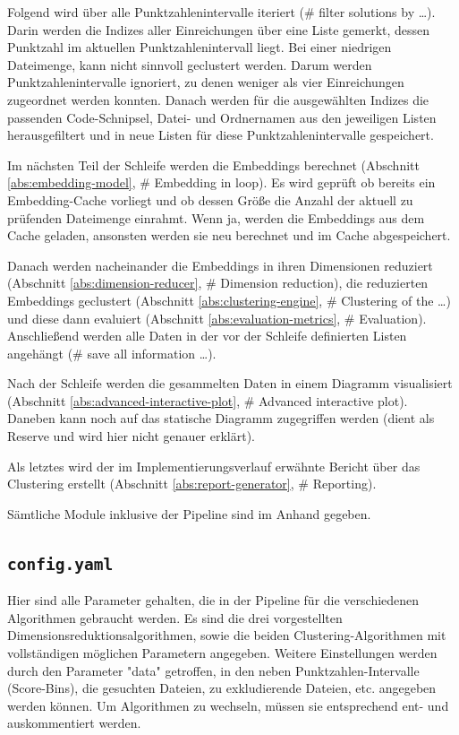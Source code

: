 Folgend wird über alle Punktzahlenintervalle iteriert (\# filter solutions by \dots). Darin werden die Indizes aller Einreichungen über eine Liste gemerkt, dessen Punktzahl im aktuellen Punktzahlenintervall liegt. Bei einer niedrigen Dateimenge, kann nicht sinnvoll geclustert werden. Darum werden Punktzahlenintervalle ignoriert, zu denen weniger als vier Einreichungen zugeordnet werden konnten. Danach werden für die ausgewählten Indizes die passenden Code-Schnipsel, Datei- und Ordnernamen aus den jeweiligen Listen herausgefiltert und in neue Listen für diese Punktzahlenintervalle gespeichert.

Im nächsten Teil der Schleife werden die Embeddings berechnet (Abschnitt \ref{abs:embedding-model}, \# Embedding in loop). Es wird geprüft ob bereits ein Embedding-Cache vorliegt und ob dessen Größe die Anzahl der aktuell zu prüfenden Dateimenge einrahmt. Wenn ja, werden die Embeddings aus dem Cache geladen, ansonsten werden sie neu berechnet und im Cache abgespeichert.

Danach werden nacheinander die Embeddings in ihren Dimensionen reduziert (Abschnitt \ref{abs:dimension-reducer}, \# Dimension reduction), die reduzierten Embeddings geclustert (Abschnitt \ref{abs:clustering-engine}, \# Clustering of the \dots) und diese dann evaluiert (Abschnitt \ref{abs:evaluation-metrics}, \# Evaluation). Anschließend werden alle Daten in der vor der Schleife definierten Listen angehängt (\# save all information \dots).

Nach der Schleife werden die gesammelten Daten in einem Diagramm visualisiert (Abschnitt \ref{abs:advanced-interactive-plot}, \# Advanced interactive plot). Daneben kann noch auf das statische Diagramm zugegriffen werden (dient als Reserve und wird hier nicht genauer erklärt).

Als letztes wird der im Implementierungsverlauf erwähnte Bericht über das Clustering erstellt (Abschnitt \ref{abs:report-generator}, \# Reporting).

Sämtliche Module inklusive der Pipeline sind im Anhand gegeben.


\subsection{\texttt{config.yaml}}
\label{abs:config.yaml}
Hier sind alle Parameter gehalten, die in der Pipeline für die verschiedenen Algorithmen gebraucht werden. Es sind die drei vorgestellten Dimensionsreduktionsalgorithmen, sowie die beiden Clustering-Algorithmen mit vollständigen möglichen Parametern angegeben. Weitere Einstellungen werden durch den Parameter "data" getroffen, in den neben Punktzahlen-Intervalle (Score-Bins), die gesuchten Dateien, zu exkludierende Dateien, etc. angegeben werden können. Um Algorithmen zu wechseln, müssen sie entsprechend ent- und auskommentiert werden.


